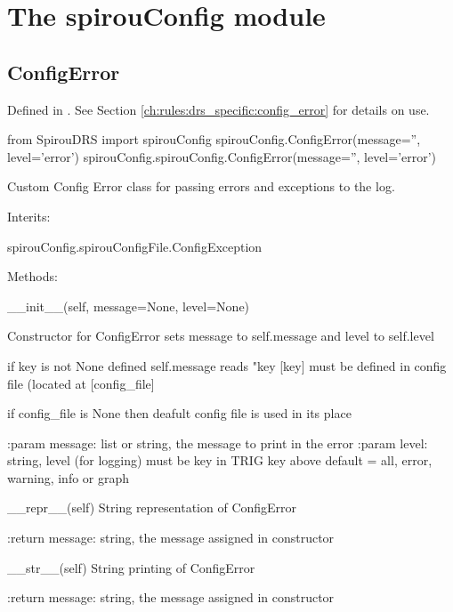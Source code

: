 
\clearpage
\newpage
\noindent\begin{minipage}{\textwidth}
\section{The spirouConfig module}
\label{ch:the_module:spirouConfig}

\subsection{ConfigError}
\label{ch:the_module:spirouConfig:ConfigError}

Defined in \spirouConfig{}.
See Section \ref{ch:rules:drs_specific:config_error} for details on use.

\begin{pythonbox}
from SpirouDRS import spirouConfig
spirouConfig.ConfigError(message='', level='error')
spirouConfig.spirouConfig.ConfigError(message='', level='error')
\end{pythonbox}

\begin{pythondocstring}
Custom Config Error class for passing errors and exceptions to the log.

Interits:

	spirouConfig.spirouConfigFile.ConfigException

Methods:

	__init__(self, message=None, level=None)

		Constructor for ConfigError sets message to self.message and level to
		self.level

		if key is not None defined self.message reads "key [key] must be
		defined in config file (located at [config_file]

		if config_file is None then deafult config file is used in its place

		:param message: list or string, the message to print in the error
		:param level: string, level (for logging) must be key in TRIG key above
		              default = all, error, warning, info or graph

	__repr__(self)
	    String representation of ConfigError
	    
	    :return message: string, the message assigned in constructor 

	__str__(self)
	    String printing of ConfigError

	    :return message: string, the message assigned in constructor

\end{pythondocstring}
\end{minipage}

